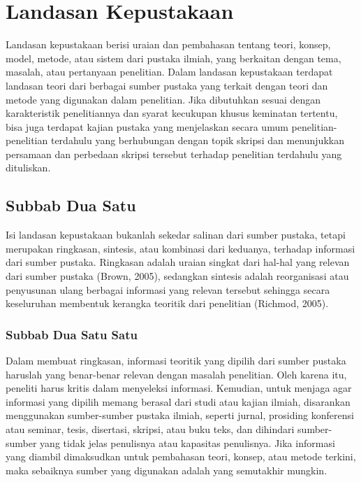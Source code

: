\newpage
\chapter{Landasan Kepustakaan}

Landasan kepustakaan berisi uraian dan pembahasan tentang teori, konsep, model, metode, atau sistem dari pustaka ilmiah, yang berkaitan dengan tema, masalah, atau pertanyaan penelitian. Dalam landasan kepustakaan terdapat landasan teori dari berbagai sumber pustaka yang terkait dengan teori dan metode yang digunakan dalam penelitian. Jika dibutuhkan sesuai dengan karakteristik penelitiannya dan syarat kecukupan khusus keminatan tertentu, bisa juga terdapat kajian pustaka yang menjelaskan secara umum penelitian-penelitian terdahulu yang berhubungan dengan topik skripsi dan menunjukkan persamaan dan perbedaan skripsi tersebut terhadap penelitian terdahulu yang dituliskan. 

\section{Subbab Dua Satu}

Isi landasan kepustakaan bukanlah sekedar salinan dari sumber pustaka, tetapi merupakan ringkasan, sintesis, atau kombinasi dari keduanya, terhadap informasi dari sumber pustaka. Ringkasan adalah uraian singkat dari hal-hal yang relevan dari sumber pustaka (Brown, 2005), sedangkan sintesis adalah reorganisasi atau penyusunan ulang berbagai informasi yang relevan tersebut sehingga secara keseluruhan membentuk kerangka teoritik dari penelitian (Richmod, 2005).

\subsection{Subbab Dua Satu Satu}

Dalam membuat ringkasan, informasi teoritik yang dipilih dari sumber pustaka haruslah yang benar-benar relevan dengan masalah penelitian. Oleh karena itu, peneliti harus kritis dalam menyeleksi informasi. Kemudian, untuk menjaga agar informasi yang dipilih memang berasal dari studi atau kajian ilmiah, disarankan menggunakan sumber-sumber pustaka ilmiah, seperti jurnal, prosiding konferensi atau seminar, tesis, disertasi, skripsi, atau buku teks, dan dihindari sumber-sumber yang tidak jelas penulisnya atau kapasitas penulisnya. Jika informasi yang diambil dimaksudkan untuk pembahasan teori, konsep, atau metode terkini, maka sebaiknya sumber yang digunakan adalah yang semutakhir mungkin.

